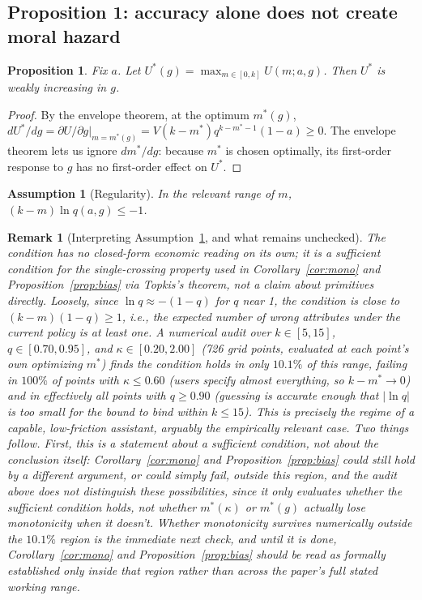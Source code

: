 \documentclass[11pt]{article}
\newtheorem{proposition}{Proposition}
\newtheorem{assumption}{Assumption}
\newtheorem{remark}{Remark}
\begin{document}
\subsection{Proposition 1: accuracy alone does not create moral hazard}

\begin{proposition}\label{prop:accuracy}
Fix $a$. Let $U^*(g) = \max_{m \in [0,k]} U(m;a,g)$. Then $U^*$ is weakly
increasing in $g$.
\end{proposition}

\begin{proof}
By the envelope theorem, at the optimum $m^*(g)$,
$dU^*/dg = \partial U/\partial g\big|_{m=m^*(g)} = V(k-m^*)q^{k-m^*-1}(1-a) \ge 0$.
The envelope theorem lets us ignore $dm^*/dg$: because $m^*$ is chosen optimally,
its first-order response to $g$ has no first-order effect on $U^*$.
\end{proof}

\begin{assumption}[Regularity]\label{ass:reg}
In the relevant range of $m$, $(k-m)\ln q(a,g) \le -1$.
\end{assumption}

\begin{remark}[Interpreting Assumption~\ref{ass:reg}, and what remains unchecked]
\label{rmk:assumption1-audit}
The condition has no closed-form economic reading on its own; it is a sufficient
condition for the single-crossing property used in Corollary~\ref{cor:mono} and
Proposition~\ref{prop:bias} via Topkis's theorem, not a claim about primitives
directly. Loosely, since $\ln q \approx -(1-q)$ for $q$ near 1, the condition is
close to $(k-m)(1-q) \ge 1$, i.e., the expected number of \emph{wrong} attributes
under the current policy is at least one. A numerical audit over
$k\in[5,15]$, $q\in[0.70,0.95]$, and $\kappa\in[0.20,2.00]$ (726 grid points,
evaluated at each point's own optimizing $m^*$) finds the condition holds in only
$10.1\%$ of this range, failing in $100\%$ of points with $\kappa\le0.60$ (users
specify almost everything, so $k-m^*\to0$) and in effectively all points with
$q\ge0.90$ (guessing is accurate enough that $|\ln q|$ is too small for the bound
to bind within $k\le15$). This is precisely the regime of a capable, low-friction
assistant, arguably the empirically relevant case. Two things follow. First, this
is a statement about a \emph{sufficient} condition, not about the conclusion
itself: Corollary~\ref{cor:mono} and Proposition~\ref{prop:bias} could still hold
by a different argument, or could simply fail, outside this region, and the audit
above does not distinguish these possibilities, since it only evaluates whether
the sufficient condition holds, not whether $m^*(\kappa)$ or $m^*(g)$ actually
lose monotonicity when it doesn't. Whether monotonicity survives numerically
outside the $10.1\%$ region is the immediate next check, and until it is done,
Corollary~\ref{cor:mono} and Proposition~\ref{prop:bias} should be read as
formally established only inside that region rather than across the paper's full
stated working range.
\end{remark}
\end{document}
